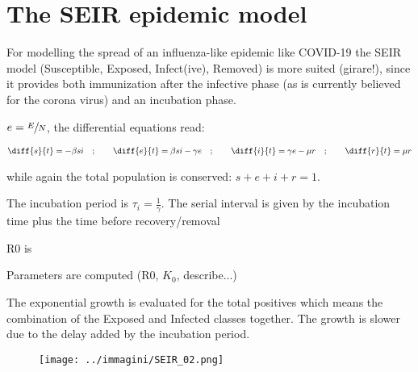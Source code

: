 \documentclass[DIV=12, BCOR=0pt]{scrartcl}  %
\begin{document}
 	
%  
  
  
  
  
  
  
  
  \section{The SEIR epidemic model}
  For modelling the spread of an influenza-like epidemic like COVID-19 the SEIR model (Susceptible, Exposed, Infect(ive), Removed) is more suited (girare!), since it provides both immunization after the infective phase (as is currently believed for the corona virus) and an incubation phase. 
  
 $e = \sfrac{E}{N}$,  the differential equations read:
  
  \begin{align}
  	\diff{s}{t} = - \beta s i \quad;  \qquad 	\diff{e}{t} = \beta s i - \gamma e \quad; \qquad \diff{i}{t} = \gamma e - \mu r \quad; \qquad \diff{r}{t} = \mu r
  \end{align}
  
  while again the total population is conserved: $s + e + i + r = 1$.
  
 The incubation period is $\tau_{i}=\frac{1}{\gamma}$. The serial interval is given by the incubation time plus the time before recovery/removal 
 
 R0 is 
  

  
  Parameters are computed (R0, $K_{0}$, describe...)
  
  The exponential growth is evaluated for the total positives which means the combination of the Exposed and Infected classes together. The growth is slower due to the delay added by the incubation period.
  
  
  \begin{figure}[h]
  	\centering
  	\texttt{[image: ../immagini/SEIR\_02.png]}
  	\caption{}
  	\label{}
  \end{figure}
  
\end{document}
